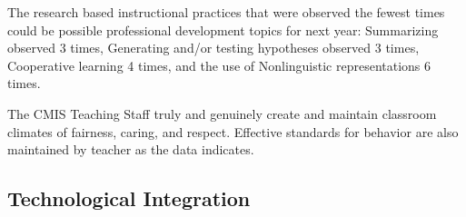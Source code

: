 \documentclass{report}
\begin{document}
\begin{findings}

The research based instructional practices that were observed the fewest times could be possible professional development topics for next year: 
Summarizing observed 3 times, Generating and/or testing hypotheses observed 3 times, Cooperative learning 4 times, and the use of  Nonlinguistic representations 6 times. 


The CMIS Teaching Staff truly and genuinely create and maintain classroom climates of fairness, caring, and respect. Effective standards for behavior are also maintained by teacher as the data indicates. 
\end{findings}

\subsection{Technological Integration}


\end{document}
